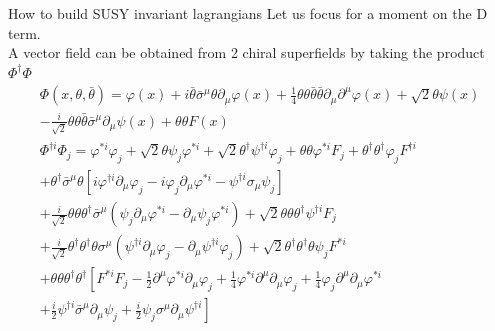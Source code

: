 \documentclass[10pt]{beamer}
\begin{document}
\begin{frame}{How to build SUSY invariant lagrangians}
    Let us focus for a moment on the D term.\\
    A vector field can be obtained from 2 chiral superfields by taking the product $\Phi^{\dagger}\Phi$
    \begin{gather*}
        \Phi(x, \theta, \bar\theta) = \varphi(x) + i\bar\theta \bar\sigma^{\mu}\theta \partial_{\mu}\varphi(x) + \frac{1}{4}\theta\theta\bar\theta\bar\theta\partial_{\mu}\partial^{\mu}\varphi(x) + \sqrt{2}\theta\psi(x)\\ 
        -\frac{i}{\sqrt{2}}\theta\theta\bar\theta\bar\sigma^{\mu}\partial_{\mu}\psi(x) + \theta\theta F(x) \\
        \Phi^{\dagger i} \Phi_{j}= \varphi^{* i} \varphi_{j}+\sqrt{2} \theta \psi_{j} \varphi^{* i}+\sqrt{2} \theta^{\dagger} \psi^{\dagger i} \varphi_{j}+\theta \theta \varphi^{* i} F_{j}+\theta^{\dagger} \theta^{\dagger} \varphi_{j} F^{\dagger i} \\
            +\theta^{\dagger} \bar{\sigma}^{\mu} \theta\left[i \varphi^{\dagger i} \partial_{\mu} \varphi_{j}-i \varphi_{j} \partial_{\mu} \varphi^{* i}-\psi^{\dagger i} \sigma_{\mu} \psi_{j}\right] \\
                +\frac{i}{\sqrt{2}} \theta \theta \theta^{\dagger} \bar{\sigma}^{\mu}\left(\psi_{j} \partial_{\mu} \varphi^{* i}-\partial_{\mu} \psi_{j} \varphi^{* i}\right)+\sqrt{2} \theta \theta \theta^{\dagger} \psi^{\dagger i} F_{j} \\
                +\frac{i}{\sqrt{2}} \theta^{\dagger} \theta^{\dagger} \theta \sigma^{\mu}\left(\psi^{\dagger i} \partial_{\mu} \varphi_{j}-\partial_{\mu} \psi^{\dagger i} \varphi_{j}\right)+\sqrt{2} \theta^{\dagger} \theta^{\dagger} \theta \psi_{j} F^{* i} \\
                +\theta \theta \theta^{\dagger} \theta^{\dagger}\left[F^{* i} F_{j}-\frac{1}{2} \partial^{\mu} \varphi^{* i} \partial_{\mu} \varphi_{j}+\frac{1}{4} \varphi^{* i} \partial^{\mu} \partial_{\mu} \varphi_{j}+\frac{1}{4} \varphi_{j} \partial^{\mu} \partial_{\mu} \varphi^{* i}\right. \\
                \left.+\frac{i}{2} \psi^{\dagger i} \bar{\sigma}^{\mu} \partial_{\mu} \psi_{j}+\frac{i}{2} \psi_{j} \sigma^{\mu} \partial_{\mu} \psi^{\dagger i}\right]
    \end{gather*}
\end{frame}
\end{document}
